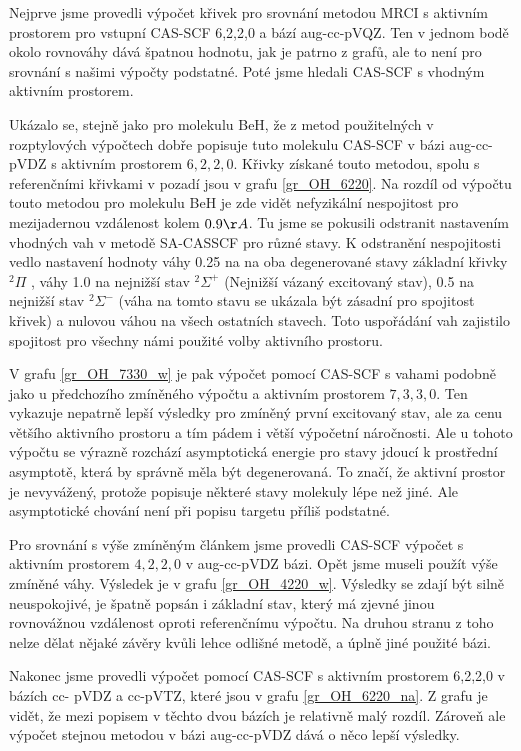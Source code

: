 Nejprve jsme provedli výpočet křivek pro srovnání metodou MRCI s 
aktivním prostorem pro vstupní CAS-SCF 6,2,2,0 a bází aug-cc-pVQZ. Ten v jednom bodě 
okolo rovnováhy dává špatnou hodnotu, jak je patrno z grafů, ale to není pro srovnání s 
našimi výpočty podstatné. Poté jsme hledali CAS-SCF s vhodným aktivním prostorem.

Ukázalo se, stejně 
jako pro molekulu BeH, že z metod použitelných v rozptylových výpočtech dobře popisuje 
tuto molekulu CAS-SCF v bázi aug-cc-pVDZ s aktivním prostorem $6,2,2,0$. Křivky  
získané touto metodou, spolu s referenčními křivkami v pozadí jsou v grafu 
\ref{gr_OH_6220}. Na rozdíl od výpočtu touto metodou pro molekulu BeH je zde vidět 
nefyzikální nespojitost pro mezijadernou vzdálenost kolem $0.9\AA$. Tu jsme se 
pokusili odstranit nastavením vhodných vah v metodě SA-CASSCF pro různé stavy. K 
odstranění nespojitosti 
vedlo nastavení hodnoty váhy 0.25 na na oba degenerované 
stavy základní křivky $^2\Pi$ ,
váhy 1.0 na nejnižší stav  $^2\Sigma^+$ (Nejnižší vázaný excitovaný stav), 0.5 na 
nejnižší stav  $^2\Sigma^-$ (váha na tomto stavu se ukázala být zásadní pro 
spojitost křivek) a nulovou váhou na všech ostatních stavech. Toto uspořádání vah 
zajistilo spojitost pro všechny námi použité volby aktivního prostoru.

V grafu \ref{gr_OH_7330_w} je pak výpočet pomocí CAS-SCF s vahami podobně 
jako u předchozího zmíněného výpočtu a aktivním prostorem $7,3,3,0$. Ten vykazuje 
nepatrně lepší výsledky pro zmíněný první excitovaný stav, ale za cenu většího 
aktivního prostoru a tím pádem i větší výpočetní náročnosti. Ale u tohoto výpočtu se 
výrazně rozchází asymptotická energie pro stavy jdoucí k prostřední asymptotě, která 
by správně měla být degenerovaná. To značí, že aktivní prostor je nevyvážený, protože 
popisuje některé stavy molekuly lépe než jiné. Ale asymptotické chování není při popisu 
targetu příliš podstatné.

Pro srovnání s výše zmíněným článkem jsme provedli CAS-SCF výpočet s aktivním prostorem 
$4,2,2,0$ v aug-cc-pVDZ bázi. Opět jsme museli použít výše zmíněné váhy.
Výsledek je v grafu \ref{gr_OH_4220_w}. Výsledky se zdají být silně neuspokojivé, je 
špatně popsán i základní stav, který má zjevné jinou rovnovážnou vzdálenost oproti 
referenčnímu výpočtu. Na druhou stranu z toho nelze dělat nějaké závěry kvůli lehce 
odlišné metodě, a úplně jiné použité bázi.

Nakonec jsme provedli výpočet pomocí CAS-SCF s aktivním prostorem 6,2,2,0 v bázích cc-
pVDZ a cc-pVTZ, které jsou v grafu \ref{gr_OH_6220_na}. Z grafu je vidět, že mezi 
popisem v těchto dvou bázích je relativně malý rozdíl. Zároveň ale výpočet stejnou 
metodou  v bázi aug-cc-pVDZ dává o něco lepší výsledky.

